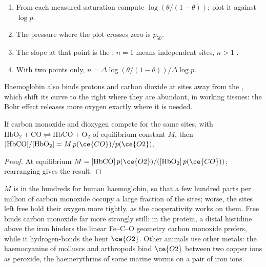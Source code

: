 \begin{method}\label{met:b3:bioinorganic:hill-plot}
\begin{enumerate}
  \item From each measured saturation compute $\log(\theta/(1 - \theta))$; plot it against $\log p$.
  \item The pressure where the plot crosses zero is $p_{50}$.
  \item The slope at that point is the : $n = 1$ means independent
        sites, $n > 1$ .
  \item With two points only, $n = \Delta\log(\theta/(1 - \theta))/\Delta\log p$.
\end{enumerate}
\end{method}

Haemoglobin also binds protons and carbon dioxide at sites away from the ,
which shift its curve to the right where they are abundant, in working tissues:
the Bohr effect releases more oxygen exactly where it is needed.

\begin{proposition}\label{prop:b3:bioinorganic:haldane}
If carbon monoxide and dioxygen compete for the same sites, with
$\mathrm{HbO_2 + CO \rightleftharpoons HbCO + O_2}$ of equilibrium constant $M$, then
$[\mathrm{HbCO}]/[\mathrm{HbO_2}] = M\,p(\ce{CO})/p(\ce{O2})$.
\end{proposition}

\begin{proof}
At equilibrium $M = [\mathrm{HbCO}]\,p(\ce{O2})/([\mathrm{HbO_2}]\,p(\ce{CO}))$; rearranging gives the result.
\end{proof}

$M$ is in the hundreds for human haemoglobin, so that a few hundred parts per
million of carbon monoxide occupy a large fraction of the sites; worse, the
sites left free hold their oxygen more tightly, as the cooperativity
works on them. Free  binds carbon monoxide far more strongly still: in
the protein, a distal histidine above the iron hinders the linear Fe--C--O
geometry carbon monoxide prefers, while it hydrogen-bonds the bent $\ce{O2}$.
Other animals use other metals: the haemocyanins of molluscs and arthropods
bind $\ce{O2}$ between two copper ions as peroxide, the haemerythrins of some marine
worms on a pair of iron ions.

